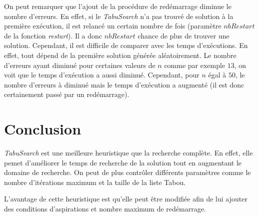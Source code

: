\documentclass[a4paper,10pt]{article}
\begin{document}
On peut remarquer que l'ajout de la procédure de redémarrage diminue le nombre d'erreurs. En effet, si le \emph{TabuSearch} n'a pas trouvé de solution à la première exécution, il est relancé un certain nombre de fois (paramètre $nbRestart$ de la fonction \emph{restart}). Il a donc $nbRestart$ chance de plus de trouver une solution.
Cependant, il est difficile de comparer avec les temps d'exécutions. En effet, tout dépend de la première solution générée aléatoirement. Le nombre d'erreurs ayant diminué pour certaines valeurs de $n$ comme par exemple $13$, on voit que le temps d'exécution a aussi diminué. Cependant, pour $n$ égal à $50$, le nombre d'erreurs à diminué mais le temps d'exécution a augmenté (il est donc certainement passé par un redémarrage).

\section{Conclusion}
\emph{TabuSearch} est une meilleure heuristique que la recherche complète. En effet, elle pemet d'améliorer le temps de recherche de la solution tout en augmentant le domaine de recherche. On peut de plus contrôler différents paramètres comme le nombre d'itérations maximum et la taille de la liste Tabou.

L'avantage de cette heuristique est qu'elle peut être modifiée afin de lui ajouter des conditions d'aspirations et nombre maximum de redémarrage.
\end{document}
